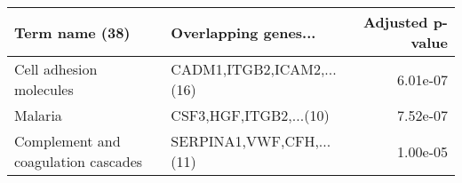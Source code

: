 \begin{tabular}{llr}
\toprule
                     Term name (38) &      Overlapping genes... &  Adjusted p-value \\
\midrule
            Cell adhesion molecules & CADM1,ITGB2,ICAM2,...(16) &          6.01e-07 \\
                            Malaria &    CSF3,HGF,ITGB2,...(10) &          7.52e-07 \\
Complement and coagulation cascades &  SERPINA1,VWF,CFH,...(11) &          1.00e-05 \\
\bottomrule
\end{tabular}
